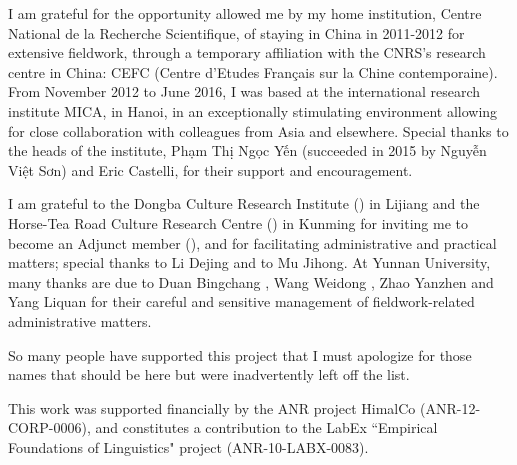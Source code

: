 I am grateful for the opportunity allowed me by my home institution, Centre National de la Recherche Scientifique, of staying in China in 2011-2012 for extensive fieldwork, through a temporary affiliation with the CNRS’s research centre in China: CEFC (Centre d’Etudes Français sur la Chine contemporaine). From November 2012 to June 2016, I was based at the international research institute MICA, in Hanoi, in an exceptionally stimulating environment allowing for close collaboration with colleagues from Asia and elsewhere. Special thanks to the heads of the institute, Phạm Thị Ngọc Yến (succeeded in 2015 by Nguyễn Việt Sơn) and Eric Castelli, for their support and encouragement.

I am grateful to the Dongba Culture Research Institute () in Lijiang and the Horse-Tea Road Culture Research Centre () in Kunming for inviting me to become an Adjunct member (), and for facilitating administrative and practical matters; special thanks to Li Dejing  and to Mu Jihong. At Yunnan University, many thanks are due to Duan Bingchang , Wang Weidong , Zhao Yanzhen  and Yang Liquan  for their careful and sensitive management of fieldwork-related administrative matters.
	
So many people have supported this project that I must apologize for those names that should be here but were inadvertently left off the list.

This work was supported financially by the ANR project HimalCo (ANR-12-CORP-0006), and constitutes a contribution to the LabEx “Empirical Foundations of Linguistics" project (ANR-10-LABX-0083).

